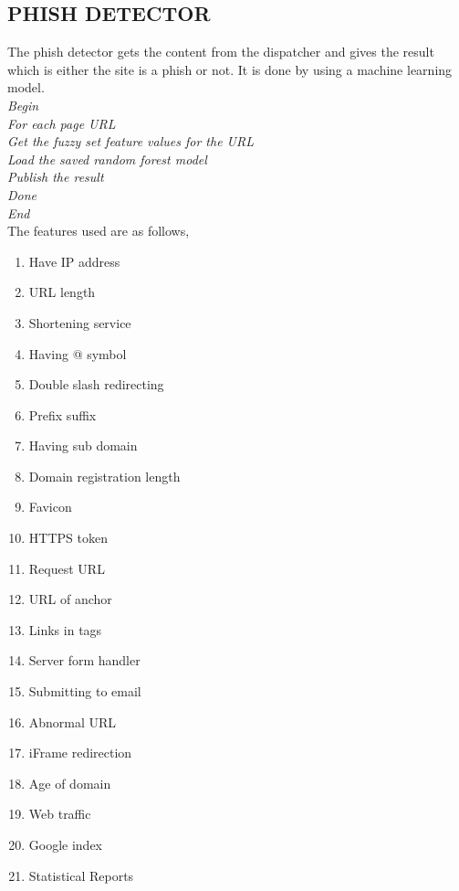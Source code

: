 \subsection{PHISH DETECTOR}
The phish detector gets the content from the dispatcher and gives the result which is either the site is a phish or not. It is done by using a machine learning model.\\
\null\quad\textit{Begin}\\
\null\quad\quad\textit{For each page URL}\\
\null\quad\quad\quad\textit{Get the fuzzy set feature values for the URL}\\
\null\quad\quad\quad\textit{Load the saved random forest model}\\
\null\quad\quad\quad\textit{Publish the result}\\
\null\quad\quad\textit{Done}\\
\null\quad\textit{End}\\

The features used are as follows,

\begin{enumerate}
  \item Have IP address
  \item URL length
  \item Shortening service
  \item Having @ symbol
  \item Double slash redirecting
  \item Prefix suffix
  \item Having sub domain
  \item Domain registration length
  \item Favicon
  \item HTTPS token
  \item Request URL
  \item URL of anchor
  \item Links in tags
  \item Server form handler
  \item Submitting to email
  \item Abnormal URL
  \item iFrame redirection
  \item Age of domain
  \item Web traffic
  \item Google index
  \item Statistical Reports
\end{enumerate}

